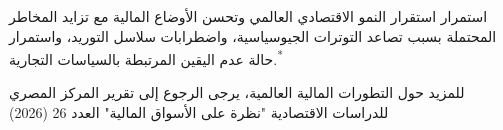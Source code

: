 استمرار استقرار النمو الاقتصادي العالمي وتحسن الأوضاع المالية مع تزايد المخاطر المحتملة بسبب تصاعد التوترات الجيوسياسية، واضطرابات سلاسل التوريد، واستمرار حالة عدم اليقين المرتبطة بالسياسات التجارية.\textsuperscript{*}

{\footnotesize * للمزيد حول التطورات المالية العالمية، يرجى الرجوع إلى تقرير المركز المصري للدراسات الاقتصادية "نظرة على الأسواق المالية" العدد 26 (2026)}
